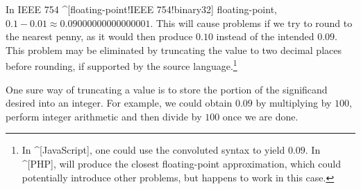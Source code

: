\begin{ex}
  In IEEE 754 ^[floating-point!IEEE 754!binary32] floating-point, $0.1-0.01
  \approx 0.09000000000000001$. This will cause problems if we try to round to
  the nearest penny, as it would then produce $0.10$ instead of the intended
  $0.09$. This problem may be eliminated by truncating the value to two decimal
  places before rounding, if supported by the source language.\footnote{In
  ^[JavaScript], one could use the convoluted syntax
   to yield $0.09$. In ^[PHP],  will
  produce the closest floating-point approximation, which could potentially
  introduce other problems, but happens to work in this case.}
\end{ex}

\begin{ex}
  One sure way of truncating a value is to store the portion of the significand
  desired into an integer. For example, we could obtain $0.09$ by multiplying by
  $100$, perform integer arithmetic and then divide by $100$ once we are done.
\end{ex}

\enddeptgroup
